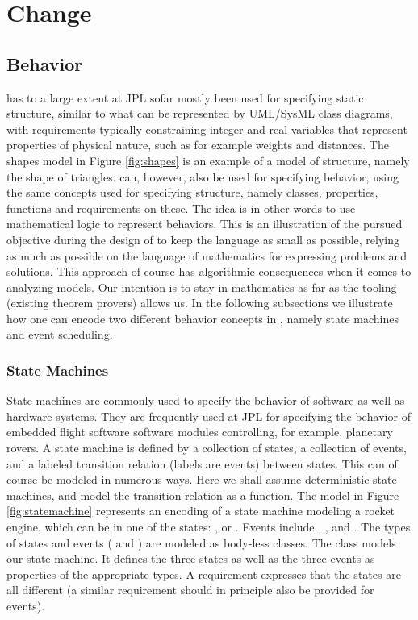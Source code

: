 \section{Change}
\label{sec:change}

\subsection{Behavior}

\Klang{} has to a large extent at JPL sofar mostly been used for specifying static 
structure, similar to what can be represented by UML/SysML class diagrams, with 
requirements typically constraining integer and real variables that represent 
properties of physical nature, such as for example weights and distances.
The shapes model in Figure \ref{fig:shapes} is an example of a model of structure, namely the shape of triangles.
\Klang{} can, however, also be used for specifying behavior, using the same
concepts used for specifying structure, namely classes, properties, functions and
requirements on these. The idea is in other words to use mathematical logic to 
represent behaviors. This is an illustration of the pursued objective during 
the design of \Klang{} to keep the language as small as possible, relying as much 
as possible on the language of mathematics for expressing problems and solutions. 
This approach of course has algorithmic consequences when it comes to analyzing 
models. Our intention is to stay in mathematics as far as the tooling (existing 
theorem provers) allows us. In the following subsections we illustrate how one can 
encode two different behavior concepts in \Klang{}, namely state machines and event 
scheduling.

\subsubsection{State Machines}

State machines are commonly used to specify the behavior of software as well as 
hardware systems. They are frequently used at JPL for specifying the behavior of
embedded flight software software modules controlling, for example, planetary 
rovers. A state machine is defined by a collection of states,
a collection of events, and a labeled transition relation (labels are events) 
between states. This can of course be modeled in numerous ways. Here we shall 
assume deterministic state machines, and model the transition relation as a 
function. 
The \Klang{} model in Figure \ref{fig:statemachine} represents an encoding of a 
state machine modeling a rocket engine, which can be in one of the states:  
,  or . Events include , 
, and . The types of states and events ( and 
) are modeled as body-less classes. The class 
models our state machine. It defines the three states as well as the 
three events as properties of the appropriate types. A requirement expresses that 
the states are all different (a similar requirement should in principle also be 
provided for events).

